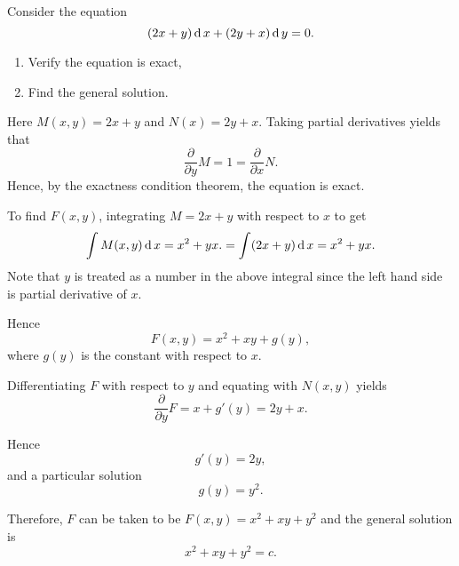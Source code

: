 \begin{exercise}
    Consider the equation
    \[(2x+y )\operatorname{d} x + (2y+ x ) \operatorname{d} y =0.\]
    \begin{enumerate}
      \item Verify the equation is exact,
      \item Find the general solution.
    \end{enumerate}
\end{exercise}
\begin{exersol}
  Here $M(x,y)=2x+y$ and $N(x)=2y+x$.
  Taking partial derivatives yields that
    \[\frac{\partial}{\partial y} M = 1 = \frac{\partial}{\partial x} N.\]
    Hence, by the exactness condition theorem, the equation is exact.

    To find $F(x,y)$, integrating $M=2x+y$ with respect to $x$ to get 
    \[\int M(x, y) \operatorname{d} x = x^2+ yx.= \int (2x + y) \operatorname{d} x = x^2+ yx.\]
    Note that $y$ is treated as a number in the above integral since the left hand side is partial derivative of $x$. 
    
    Hence
    \[F(x, y)= x^2 + xy + g(y),\]
    where $g(y)$ is the constant with respect to $x$. 
    
    Differentiating $F$ with respect to $y$ and equating with $N(x, y)$ yields
    \[     
    \frac{\partial}{\partial y}  F = x + g'(y) = 2y+x.
    \]

    Hence 
    \[
    g'(y) =2y,
    \]
    and a particular solution
    \[
    g(y)= y^2.
    \]

    Therefore, $F$ can be taken to be $F(x,y)= x^2+ xy + y^2$ and the general solution is
    \[
    x^2 + xy + y^2= c.
    \]
\end{exersol}
